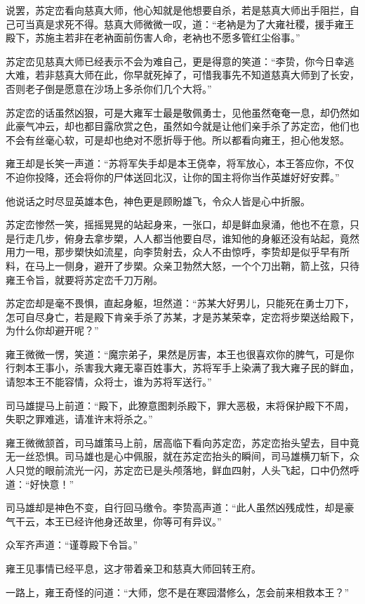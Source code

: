 说罢，苏定峦看向慈真大师，他心知就是他想要自杀，若是慈真大师出手阻拦，自己可当真是求死不得。慈真大师微微一叹，道：“老衲是为了大雍社稷，援手雍王殿下，苏施主若非在老衲面前伤害人命，老衲也不愿多管红尘俗事。”

苏定峦见慈真大师已经表示不会为难自己，更是得意的笑道：“李贽，你今日幸逃大难，若非慈真大师在此，你早就死掉了，可惜我事先不知道慈真大师到了长安，否则老子倒是愿意在沙场上多杀你们几个大将。”

苏定峦的话虽然凶狠，可是大雍军士最是敬佩勇士，见他虽然奄奄一息，却仍然如此豪气冲云，却也都目露欣赏之色，虽然如今就是让他们亲手杀了苏定峦，他们也不会有丝毫心软，可是却也绝对不愿折辱于他。所以都看向雍王，担心他发怒。

雍王却是长笑一声道：“苏将军失手却是本王侥幸，将军放心，本王答应你，不仅不迫你投降，还会将你的尸体送回北汉，让你的国主将你当作英雄好好安葬。”

他说话之时尽显英雄本色，神色更是顾盼雄飞，令众人皆是心中折服。

苏定峦惨然一笑，摇摇晃晃的站起身来，一张口，却是鲜血泉涌，他也不在意，只是行走几步，俯身去拿步槊，人人都当他要自尽，谁知他的身躯还没有站起，竟然用力一甩，那步槊快如流星，向李贽射去，众人不由惊呼，李贽却是似乎早有所料，在马上一侧身，避开了步槊。众亲卫勃然大怒，一个个刀出鞘，箭上弦，只待雍王令旨，就要将苏定峦千刀万剐。

苏定峦却是毫不畏惧，直起身躯，坦然道：“苏某大好男儿，只能死在勇士刀下，怎可自尽身亡，若是殿下肯亲手杀了苏某，才是苏某荣幸，定峦将步槊送给殿下，为什么你却避开呢？”

雍王微微一愣，笑道：“魔宗弟子，果然是厉害，本王也很喜欢你的脾气，可是你行刺本王事小，杀害我大雍无辜百姓事大，苏将军手上染满了我大雍子民的鲜血，请恕本王不能容情，众将士，谁为苏将军送行。”

司马雄提马上前道：“殿下，此獠意图刺杀殿下，罪大恶极，末将保护殿下不周，失职之罪难逃，请准许末将杀之。”

雍王微微颔首，司马雄策马上前，居高临下看向苏定峦，苏定峦抬头望去，目中竟无一丝恐惧。司马雄也是心中佩服，就在苏定峦抬头的瞬间，司马雄横刀斩下，众人只觉的眼前流光一闪，苏定峦已是头颅落地，鲜血四射，人头飞起，口中仍然呼道：“好快意！”

司马雄却是神色不变，自行回马缴令。李贽高声道：“此人虽然凶残成性，却是豪气干云，本王已经许他身还故里，你等可有异议。”

众军齐声道：“谨尊殿下令旨。”

雍王见事情已经平息，这才带着亲卫和慈真大师回转王府。

一路上，雍王奇怪的问道：“大师，您不是在寒园潜修么，怎会前来相救本王？”

